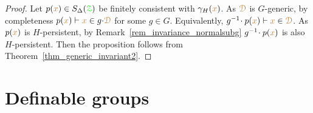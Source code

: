 \begin{proof}
  Let $p({\color{brown} x})\in S_\Delta({\color{green}\EuScript Z})$ be finitely consistent with $\gamma_H({\color{brown} x})$.
  As ${\color{brown}\EuScript D}$ is $G$-generic, by completeness $p({\color{brown} x})\vdash{\color{brown}x}\in g{\cdot}{\color{brown}\EuScript D}$ for some $g\in G$.
  Equivalently, $g^{-1}\!\cdot p({\color{brown} x})\vdash{\color{brown}x}\in{\color{brown}\EuScript D}$.
  As $p({\color{brown} x})$ is $H$-persistent, by Remark~\ref{rem_invariance_normalsubg} $g^{-1}\!\cdot p({\color{brown} x})$ is also $H$-persistent.
  Then the proposition follows from Theorem~\ref{thm_generic_invariant2}.
\end{proof}
\begin{comment}
The following normal subgroup of $G$ is particularly interesting

{
\def\medrel#1{\parbox[t]{5ex}{$\displaystyle\hfil #1$}}
\def\ceq#1#2#3{\parbox[t]{8ex}{$\displaystyle #1$}\medrel{#2}{$\displaystyle #3$}}

\ceq{\hfill G^0}{=}{\big\{g\in G\ :\ g{\cdot}\mrD=\mrD\textrm{ for every }G\textrm{-generic }\qfDelta(\grZ)\textrm{-type-definable set }\mrD\big\}}.
}

Note that by Exercise~\ref{ex_generic_type_vs_formulas} we can replace type-definable with definable in the definition of $G^0$.

\begin{proposition}
  Assume the action of $G$ is regular.
  Let $K\le G$ be such that all $K$-orbits (that is, $K{\cdot}{\mr a}$, for ${\mr a}\in\mrX$) are $\qfDelta(\grZ)$-type-definable.
  Then, if $K$ has finite index, $G^0\le K$.
\end{proposition}

\begin{proof}
  Let $g\in G^0$.
  As $K$ has finite index and the action is transitive $K{\cdot}{\mr a}$ is $G$-generic for every ${\mr a}\in\mrX$.
  Then $g{\cdot}K{\cdot}{\mr a}=K{\cdot}{\mr a}$.
  By regularity, $g{\cdot}K=K$, then $g\in K$.
\end{proof}
\end{comment}

\section{Definable groups}\label{definablegroups}

\def\medrel#1{\parbox[t]{5ex}{$\displaystyle\hfil #1$}}
\def\ceq#1#2#3{\parbox[t]{25ex}{$\displaystyle #1$}\medrel{#2}{$\displaystyle #3$}}

